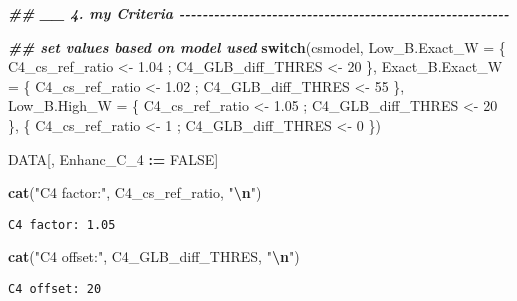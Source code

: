 \documentclass[
  10pt,
  a4paper,oneside]{article}
\newenvironment{Shaded}{\begin{snugshade}}{\end{snugshade}}
\newcommand{\AttributeTok}[1]{\textcolor[rgb]{0.13,0.29,0.53}{#1}}
\newcommand{\ConstantTok}[1]{\textcolor[rgb]{0.56,0.35,0.01}{#1}}
\newcommand{\ControlFlowTok}[1]{\textcolor[rgb]{0.13,0.29,0.53}{\textbf{#1}}}
\newcommand{\DecValTok}[1]{\textcolor[rgb]{0.00,0.00,0.81}{#1}}
\newcommand{\DocumentationTok}[1]{\textcolor[rgb]{0.56,0.35,0.01}{\textbf{\textit{#1}}}}
\newcommand{\FloatTok}[1]{\textcolor[rgb]{0.00,0.00,0.81}{#1}}
\newcommand{\FunctionTok}[1]{\textcolor[rgb]{0.13,0.29,0.53}{\textbf{#1}}}
\newcommand{\NormalTok}[1]{#1}
\newcommand{\OtherTok}[1]{\textcolor[rgb]{0.56,0.35,0.01}{#1}}
\newcommand{\SpecialCharTok}[1]{\textcolor[rgb]{0.81,0.36,0.00}{\textbf{#1}}}
\newcommand{\StringTok}[1]{\textcolor[rgb]{0.31,0.60,0.02}{#1}}
\begin{document}
\begin{Shaded}
\begin{Highlighting}[]
\DocumentationTok{\#\# \_\_ 4. my  Criteria  {-}{-}{-}{-}{-}{-}{-}{-}{-}{-}{-}{-}{-}{-}{-}{-}{-}{-}{-}{-}{-}{-}{-}{-}{-}{-}{-}{-}{-}{-}{-}{-}{-}{-}{-}{-}{-}{-}{-}{-}{-}{-}{-}{-}{-}{-}{-}{-}{-}{-}{-}{-}{-}{-}{-}{-}{-}}

\DocumentationTok{\#\# set values based on model used}
\ControlFlowTok{switch}\NormalTok{(csmodel,}
       \AttributeTok{Low\_B.Exact\_W   =}\NormalTok{ \{ C4\_cs\_ref\_ratio }\OtherTok{\textless{}{-}} \FloatTok{1.04}\NormalTok{ ; C4\_GLB\_diff\_THRES }\OtherTok{\textless{}{-}} \DecValTok{20}\NormalTok{ \},}
       \AttributeTok{Exact\_B.Exact\_W =}\NormalTok{ \{ C4\_cs\_ref\_ratio }\OtherTok{\textless{}{-}} \FloatTok{1.02}\NormalTok{ ; C4\_GLB\_diff\_THRES }\OtherTok{\textless{}{-}} \DecValTok{55}\NormalTok{ \},}
       \AttributeTok{Low\_B.High\_W    =}\NormalTok{ \{ C4\_cs\_ref\_ratio }\OtherTok{\textless{}{-}} \FloatTok{1.05}\NormalTok{ ; C4\_GLB\_diff\_THRES }\OtherTok{\textless{}{-}} \DecValTok{20}\NormalTok{ \},}
\NormalTok{                         \{ C4\_cs\_ref\_ratio }\OtherTok{\textless{}{-}} \DecValTok{1}\NormalTok{    ; C4\_GLB\_diff\_THRES }\OtherTok{\textless{}{-}}  \DecValTok{0}\NormalTok{ \})}

\NormalTok{DATA[, Enhanc\_C\_4 }\SpecialCharTok{:=} \ConstantTok{FALSE}\NormalTok{]}


\FunctionTok{cat}\NormalTok{(}\StringTok{"C4 factor:"}\NormalTok{, C4\_cs\_ref\_ratio,   }\StringTok{"}\SpecialCharTok{\textbackslash{}n}\StringTok{"}\NormalTok{)}
\end{Highlighting}
\end{Shaded}

\begin{verbatim}
C4 factor: 1.05 
\end{verbatim}

\begin{Shaded}
\begin{Highlighting}[]
\FunctionTok{cat}\NormalTok{(}\StringTok{"C4 offset:"}\NormalTok{, C4\_GLB\_diff\_THRES, }\StringTok{"}\SpecialCharTok{\textbackslash{}n}\StringTok{"}\NormalTok{)}
\end{Highlighting}
\end{Shaded}

\begin{verbatim}
C4 offset: 20 
\end{verbatim}
\end{document}
